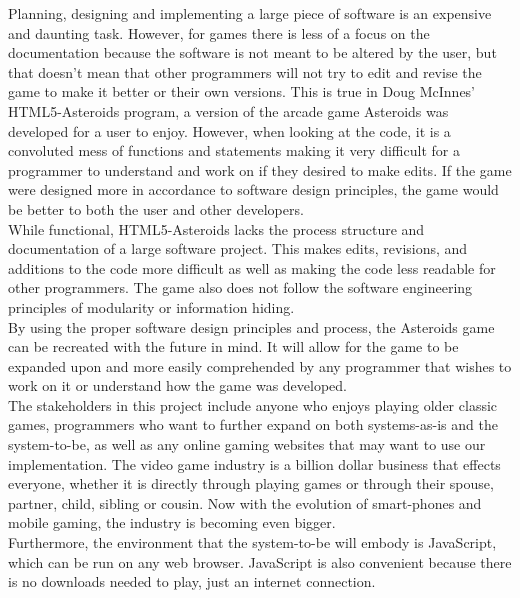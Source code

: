 \documentclass{article}
\begin{document}
Planning, designing and implementing a large piece of software is an expensive and
daunting task. However, for games there is less of a focus on the documentation because the
software is not meant to be altered by the user, but that doesn't mean that other programmers
will not try to edit and revise the game to make it better or their own versions.
This is true in Doug McInnes' HTML5-Asteroids program, a version of the arcade game Asteroids
was developed for a user to enjoy. However, when looking at the code, it is a convoluted mess of
functions and statements making it very difficult for a programmer to understand and work on
if they desired to make edits. If the game were designed more in accordance to software design
principles, the game would be better to both the user and other developers.\\
While functional, HTML5-Asteroids lacks the process structure and
documentation of a large software project. This makes edits, revisions, and additions to the
code more difficult as well as making the code less readable for other programmers. The game
also does not follow the software engineering principles of modularity or information hiding.\\
By using the proper software design principles and process, the Asteroids game can
be recreated with the future in mind. It will allow for the game to be expanded upon and more
easily comprehended by any programmer that wishes to work on it or understand how the game was
developed.\\
The stakeholders in this project include anyone who enjoys playing older classic games, programmers
who want to further expand on both systems-as-is and the system-to-be, as well as any online gaming
websites that may want to use our implementation.
The video game industry is a billion dollar business that effects everyone, whether it is directly
through playing games or through their spouse, partner, child, sibling or cousin. Now with the
evolution of smart-phones and mobile gaming, the industry is becoming even bigger.\\
Furthermore, the environment that the system-to-be will embody is JavaScript, which can be run on
any web browser. JavaScript is also convenient because there is no downloads needed to play,
just an internet connection.





\end{document}
